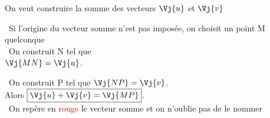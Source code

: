 \documentclass[a4paper,11pt,french]{report}
\begin{document}
\noindent
\begin{minipage}[t]{5.6cm}
On veut construire la somme des vecteurs $\Vj{u}$ et $\Vj{v}$
\end{minipage}
\hspace*{0.3cm}
\begin{minipage}[t]{5.6cm}
\ Si l'origine du vecteur somme n'est pas imposée, on choisit un point M quelconque\\
\ On construit N tel que \\ $\Vj{MN}=\Vj{u}$.
\end{minipage}
\hspace*{0.3cm}
\begin{minipage}[t]{5.6cm}
\ On construit P tel que $\Vj{NP}=\Vj{v}$. \\
Alors $\boxed{\Vj{u}+\Vj{v}=\Vj{MP}}$.\\[4pt]
\ On repère en \textcolor{red}{rouge} le vecteur somme et on n'oublie pas de le nommer
\end{minipage}

\medskip
\end{document}
